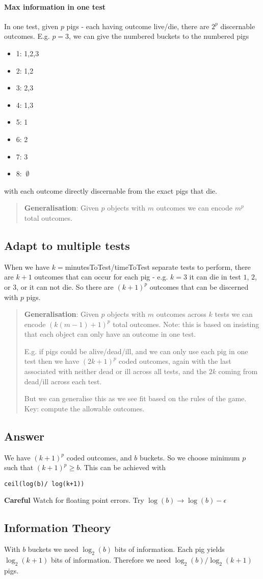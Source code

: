 \documentclass[a4,10pt]{article}
\begin{document}
\paragraph{Max information  in one test}
In one test, given $p$ pigs - each having outcome live/die, there are $2^p$ discernable outcomes. E.g. $p=3$, we can give the numbered buckets to the numbered pigs
\begin{itemize}
\item 1: 1,2,3
\item 2: 1,2
\item 3: 2,3
\item 4: 1,3
\item 5: 1
\item 6: 2
\item 7: 3
\item 8:$\;\;\emptyset$
\end{itemize}
with each outcome directly discernable from the exact pigs that die.
\begin{quote}{\bf Generalisation}: Given $p$ objects with $m$ outcomes we can encode $m^p$ total outcomes.
\end{quote}
\subsection*{Adapt to multiple tests}
When we have $k = $minutesToTest/timeToTest separate tests to perform, there are $k+1$ outcomes that can occur for each pig - e.g. $k=3$ it can die in test $1$, $2$, or $3$, or it can not die. So there are  $(k+1)^p$ outcomes that can be discerned with $p$ pigs.
\begin{quote}{\bf Generalisation}: Given $p$ objects with $m$ outcomes across $k$ tests we can encode $(k(m-1)+1)^p$ total outcomes. Note: this is based on insisting that each object can only have an outcome in one test.
\par
E.g. if pigs could be alive/dead/ill, and we can only use each pig in one test then we have $(2k+1)^p$ coded outcomes, again with the last associated with neither dead or ill across all tests, and the $2k$ coming from dead/ill across each test.
\par
But we can generalise this as we see fit based on the rules of the game. Key: compute the allowable outcomes.
\end{quote}
\subsection*{Answer}
We have $(k+1)^p$ coded outcomes, and $b$ buckets. So we choose minimum $p$ such that $(k+1)^p \geq b$. This can be achieved with
\begin{verbatim}
ceil(log(b)/ log(k+1))
\end{verbatim}
{\bf Careful} Watch for floating point errors. Try $\log(b) \to \log(b)-\epsilon$
\subsection*{Information Theory}
With $b$ buckets we need $\log_2(b)$ bits of information. Each pig yields $\log_2(k+1)$ bits of information. Therefore we need $\log_2(b)/\log_2(k+1)$ pigs.
\end{document}
